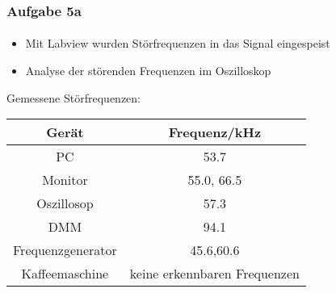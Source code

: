 \begin{frame}
\frametitle{Aufgabe 5a}
\framesubtitle{}
\begin{itemize}
    \item Mit Labview wurden Störfrequenzen in das Signal eingespeist
    \item Analyse der störenden Frequenzen im Oszilloskop
\end{itemize}
Gemessene Störfrequenzen:
\begin{center}
    \begin{tabular}{c|c}
        Gerät & Frequenz/kHz \\
        \hline
        PC & 53.7 \\
        Monitor & 55.0, 66.5 \\
        Oszillosop & 57.3 \\
        DMM & 94.1 \\
        Frequenzgenerator &45.6,60.6 \\
        Kaffeemaschine & keine erkennbaren Frequenzen
    \end{tabular}
\end{center}
\end{frame}
